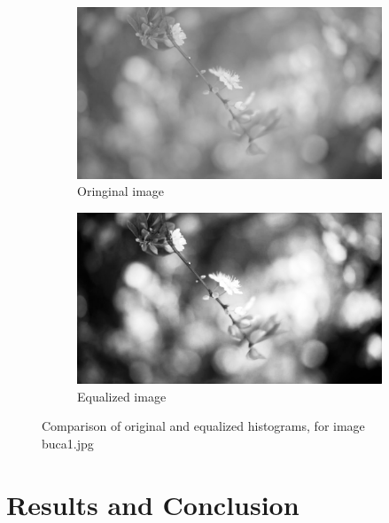 \documentclass[10pt]{article}
\begin{document}
\begin{figure}[ht]
  \centering
  \begin{subfigure}[c]{0.4\textwidth}
    \includegraphics[width=\textwidth]{images/flower1-neq.jpg}
    \caption{Oringinal image}
    \label{fig:original-histogram}
  \end{subfigure}
  \begin{subfigure}[d]{0.4\textwidth}
    \includegraphics[width=\textwidth]{images/flower1-neq_out.jpg}
    \caption{Equalized image}
    \label{fig:equalized-histogram}
  \end{subfigure}
  \caption{Comparison of original and equalized histograms, for image buca1.jpg}
\end{figure}

\pagebreak

\section{Results and Conclusion}
\label{sec:Introduction}
\end{document}
